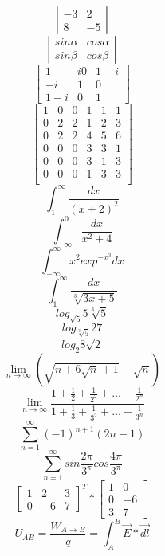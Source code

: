 \documentclass[10pt]{article}
\begin{document}
$$\left|\begin{array} {ccccc}
-3&2\\
8&-5
\end{array}\right|$$
$$\left|\begin{array} {ccccc}
sin\alpha&cos\alpha\\
sin\beta&cos\beta
\end{array}\right|$$
$$
\left[\begin{array} {ccccc}
1&i0&1+i\\
-i &1 &0\\
1-i &0& 1
\end{array}\right]$$
$$
\left[\begin{array} {c|ll|cccccc}
1&0&0&1&1&1\\
\hline
0 &2&2&1&2&3\\
0 &2&2&4&5&6\\
\hline
0&0&0&3&3&1\\
0&0&0&3&1&3\\
0&0&0&1&3&3\\
\end{array}\right]$$
$$\int_1^{\infty}\frac{dx}{(x+2)^{2}}$$
$$\int_{-\infty}^{0}\frac{dx}{x^{2}+4}$$
$$\int_{-\infty}^{\infty} x^{2} exp^{-x^{3}}dx$$
$$\int_1^{\infty} \frac{dx}{\sqrt[{3}]{3x+5}}$$
$$log_{\sqrt{5}}5\sqrt[3]{5}$$
$$log_{\sqrt[3]{5}}27$$
$$log_2 8\sqrt{2}$$
$$\lim_{n\to\infty}\left(\sqrt{n+6\sqrt{n}+1}-\sqrt{n}\right)$$
$$\lim_{n\to\infty}\frac{1+\frac{1}{2}+\frac{1}{2^{2}}+\ldots+\frac{1}{2^{n}}}{1+\frac{1}{3}+\frac{1}{3^{2}}+\ldots+\frac{1}{3^{n}}}$$
$$\sum_{n=1}^{\infty}(-1)^{n+1}(2n-1)$$
$$\sum_{n=1}^{\infty}sin\frac{2\pi}{3^{\pi}}cos\frac{4\pi}{3^{\pi}}$$
$$\left[\begin{array} {ccccc}
1&2&3\\
0&-6&7
\end{array}\right]^T
*\left[\begin{array} {ccccc}
1&0\\
0&-6\\
3&7
\end{array}\right]
$$
$$U_{AB}=\frac{W_{A \to B}}{q}=\int_A^{B}\overrightarrow{E}*\overrightarrow{dl}$$
\end{document}
